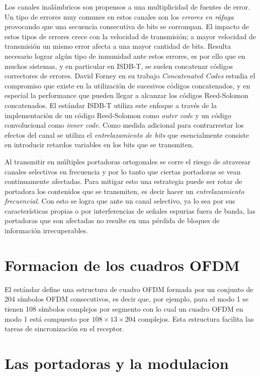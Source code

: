 Los canales inal\'ambricos son propensos a una multiplicidad de fuentes de error. Un tipo de errores muy comunes en estos canales son los \textit{errores en r\'afaga} provocando que una secuencia consecutiva de bits se corrompan. El impacto de estos tipos de errores crece con la velocidad de transmisi\'on; a mayor velocidad de transmisi\'on un mismo error afecta a una mayor cantidad de bits.
Resulta necesario lograr alg\'un tipo de inmunidad ante estos errores, es por ello que en muchos sistemas, y en particular en ISDB-T, se suelen concatenar c\'odigos correctores de errores. David Forney en su trabajo \textit{Concatenated Codes} \cite{forney1965concatenated} estudia el compromiso que existe en la utilizaci\'on de sucesivos c\'odigos concatenados, y en especial la performance que pueden llegar a alcanzar los c\'odigos Reed-Solomon concatenados.
El est\'andar ISDB-T utiliza este enfoque a trav\'es de la implementaci\'on de un c\'odigo Reed-Solomon como \textit{outer code} y un c\'odigo convolucional como \textit{inner code}.
Como medida adicional para contrarrestar los efectos del canal se utiliza el \textit{entrelazamiento de bits} que esencialmente consiste en introducir retardos variables en los bits que se transmiten.

Al transmitir en m\'ultiples portadoras ortogonales se corre el riesgo de atravesar canales selectivos en frecuencia y por lo tanto que ciertas portadoras se vean continuamente afectadas. Para mitigar esto una estrategia puede ser rotar de portadora los contenidos que se transmiten, es decir hacer un \textit{entrelazamiento frecuencial}. Con esto se logra que ante un canal selectivo, ya lo sea por sus caracter\'isticas propias o por interferencias de señales espurias fuera de banda, las portadoras que son afectadas no resulte en una p\'erdida de bloques de informaci\'on irrecuperables.


\section{Formacion de los cuadros OFDM}

El estándar define una estructura de cuadro OFDM formada por un conjunto de 204 símbolos OFDM consecutivos, es decir que, por ejemplo, para el modo 1 se tienen 108 símbolos complejos por segmento con lo cual un cuadro OFDM en modo 1 está compuesto por $108 \times 13 \times 204$ complejos. Esta estructura facilita las tareas de sincronización en el receptor.


\section{Las portadoras y la modulacion}

